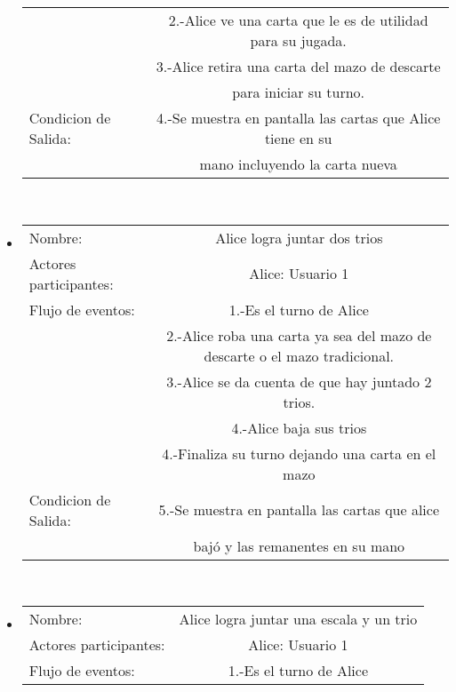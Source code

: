 \begin{itemize}
\begin{tabular}{ l | c  }
                                        & 2.-Alice ve una carta que le es de utilidad para su jugada. \\
                                        & 3.-Alice retira una carta del mazo de descarte\\ & para iniciar su turno. \\\hline
        Condicion de Salida:            & 4.-Se muestra en pantalla las cartas que Alice tiene en su\\
                                        &mano incluyendo la carta nueva\\
    \end{tabular}
    \\
\item
    \begin{tabular}{ l | c  }
        Nombre:                      & Alice logra juntar dos trios \\
        Actores participantes:          & Alice: Usuario  1                                              \\\hline
        Flujo de eventos:               & 1.-Es el turno de Alice                                 \\
                                        & 2.-Alice roba una carta ya sea del mazo de descarte o el mazo tradicional.\\
                                        & 3.-Alice se da cuenta de que hay juntado 2 trios. \\
                                        & 4.-Alice baja sus trios                      \\
                                        & 4.-Finaliza su turno dejando una carta en el mazo             \\\hline
        Condicion de Salida:            & 5.-Se muestra en pantalla las cartas que alice \\ & bajó y las remanentes en su mano 
                                            \\\hline
    \end{tabular}
    \\
\item
    \begin{tabular}{ l | c  }
        Nombre:            & Alice logra juntar una escala y un trio\\
        Actores participantes: & Alice: Usuario  1                                              \\\hline
        Flujo de eventos:               & 1.-Es el turno de Alice                                 \\

\end{tabular}
\end{itemize}
